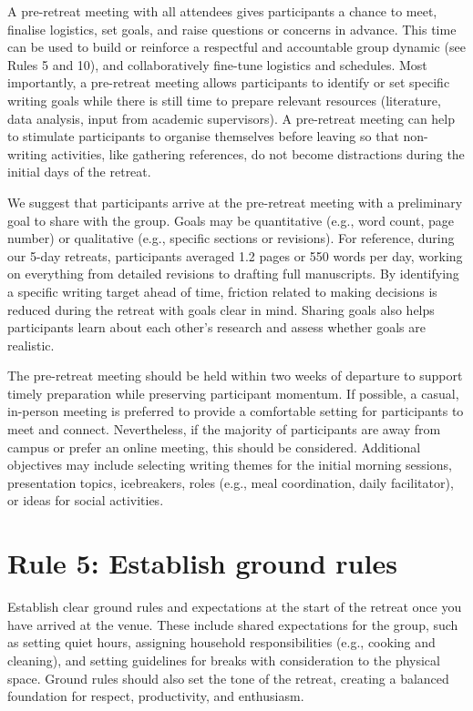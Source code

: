 \documentclass[10pt,letterpaper]{article}
\begin{document}
A pre-retreat meeting with all attendees gives participants a chance to meet, finalise logistics, set goals, and raise questions or concerns in advance. This time can be used to build or reinforce a respectful and accountable group dynamic (see Rules 5 and 10), and collaboratively fine-tune logistics and schedules. Most importantly, a pre-retreat meeting allows participants to identify or set specific writing goals while there is still time to prepare relevant resources (literature, data analysis, input from academic supervisors). A pre-retreat meeting can help to stimulate participants to organise themselves before leaving so that non-writing activities, like gathering references, do not become distractions during the initial days of the retreat.

We suggest that participants arrive at the pre-retreat meeting with a preliminary goal to share with the group. Goals may be quantitative (e.g., word count, page number) or qualitative (e.g., specific sections or revisions). For reference, during our 5-day retreats, participants averaged 1.2 pages or 550 words per day, working on everything from detailed revisions to drafting full manuscripts. By identifying a specific writing target ahead of time, friction related to making decisions is reduced during the retreat with goals clear in mind. Sharing goals also helps participants learn about each other's research and assess whether goals are realistic.

The pre-retreat meeting should be held within two weeks of departure to support timely preparation while preserving participant momentum. If possible, a casual, in-person meeting is preferred to provide a comfortable setting for participants to meet and connect. Nevertheless, if the majority of participants are away from campus or prefer an online meeting, this should be considered. Additional objectives may include selecting writing themes for the initial morning sessions, presentation topics, icebreakers, roles (e.g., meal coordination, daily facilitator), or ideas for social activities.

\section*{Rule 5: Establish ground rules}

Establish clear ground rules and expectations at the start of the retreat once you have arrived at the venue. These include shared expectations for the group, such as setting quiet hours, assigning household responsibilities (e.g., cooking and cleaning), and setting guidelines for breaks with consideration to the physical space. Ground rules should also set the tone of the retreat, creating a balanced foundation for respect, productivity, and enthusiasm.
\end{document}
